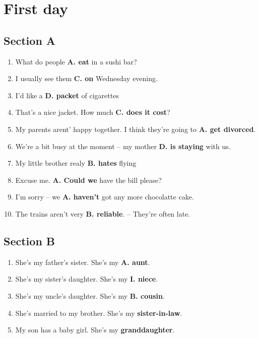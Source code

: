 \documentclass[11pt]{article}
\date{\today}
\title{}
\begin{document}
\tableofcontents

\section{First day}
\label{sec:org2b82c1f}
\subsection{Section A}
\label{sec:orga479a89}
\begin{enumerate}
\item What do people \textbf{A. eat} in a sushi bar?
\item I usually see them \textbf{C. on}  Wednesday evening.
\item I'd like a \textbf{D. packet} of cigarettes
\item That's a nice jacket. How much \textbf{C. does it cost}?
\item My parents arent' happy together. I think they're going to
\textbf{A. get divorced}.
\item We're a bit busy at the moment -- my mother \textbf{D. is staying}
with us.
\item My little brother realy \textbf{B. hates} flying
\item Excuse me. \textbf{A. Could we} have the bill please?
\item I'm sorry -- we \textbf{A. haven't} got any more chocolatte cake.
\item The trains aren't very \textbf{B. reliable}. -- They're often late.
\end{enumerate}

\subsection{Section B}
\label{sec:org0d8e7e2}
\begin{enumerate}
\item She's my father's sister. She's my \textbf{A. aunt}.
\item She's my sister's daughter. She's my \textbf{I. niece}.
\item She's my uncle's daughter. She's my \textbf{B. cousin}.
\item She's married to my brother. She's my \textbf{sister-in-law}.
\item My son has a baby girl. She's my \textbf{granddaughter}.
\end{enumerate}
\end{document}
